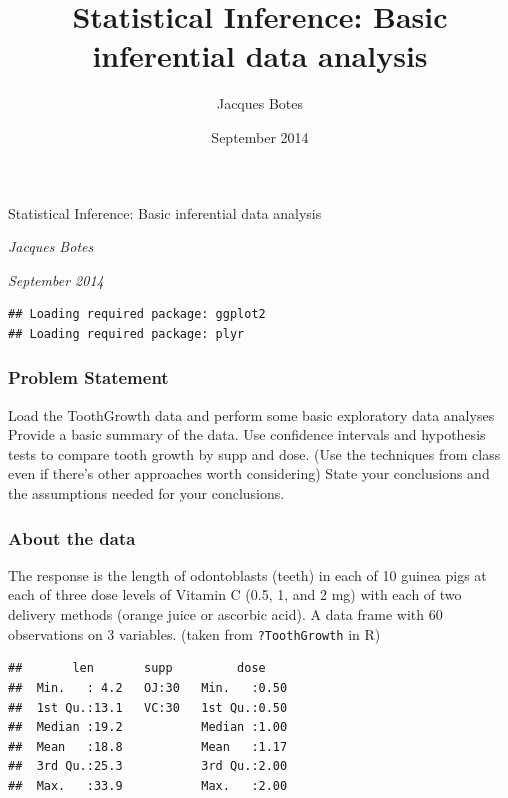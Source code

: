 \documentclass[]{article}
\title{Statistical Inference: Basic inferential data analysis}
\author{Jacques Botes}
\date{September 2014}
\begin{document}
\begin{center}
\huge Statistical Inference: Basic inferential data analysis \\[0.2cm]
\end{center}
\begin{center}
\large \emph{Jacques Botes}\\[0.1cm]
\end{center}
\begin{center}
\large \emph{September 2014} \\
\end{center}
\normalsize


\begin{verbatim}
## Loading required package: ggplot2
## Loading required package: plyr
\end{verbatim}

\subsubsection{Problem Statement}\label{problem-statement}

Load the ToothGrowth data and perform some basic exploratory data
analyses Provide a basic summary of the data. Use confidence intervals
and hypothesis tests to compare tooth growth by supp and dose. (Use the
techniques from class even if there's other approaches worth
considering) State your conclusions and the assumptions needed for your
conclusions.

\subsubsection{About the data}\label{about-the-data}

The response is the length of odontoblasts (teeth) in each of 10 guinea
pigs at each of three dose levels of Vitamin C (0.5, 1, and 2 mg) with
each of two delivery methods (orange juice or ascorbic acid). A data
frame with 60 observations on 3 variables. (taken from
\texttt{?ToothGrowth} in R)

\begin{verbatim}
##       len       supp         dose     
##  Min.   : 4.2   OJ:30   Min.   :0.50  
##  1st Qu.:13.1   VC:30   1st Qu.:0.50  
##  Median :19.2           Median :1.00  
##  Mean   :18.8           Mean   :1.17  
##  3rd Qu.:25.3           3rd Qu.:2.00  
##  Max.   :33.9           Max.   :2.00
\end{verbatim}
\end{document}
